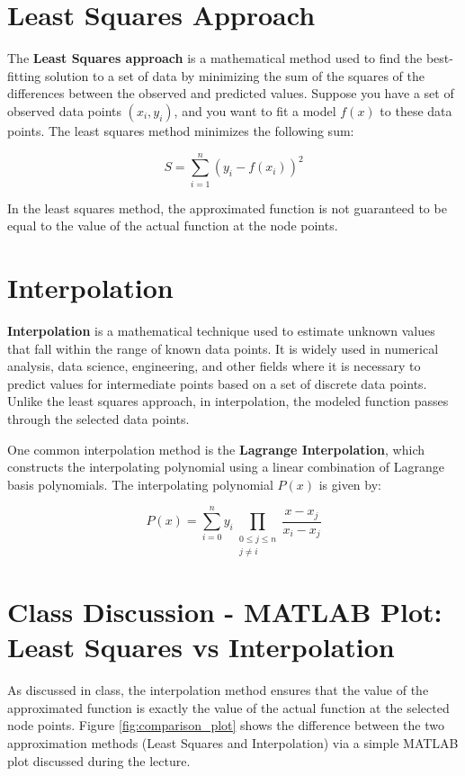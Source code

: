 \documentclass[12pt]{report} %
\begin{document}
\section{Least Squares Approach}
The \textbf{Least Squares approach} is a mathematical method used to find the best-fitting solution to a set of data by minimizing the sum of the squares of the differences between the observed and predicted values. Suppose you have a set of observed data points $(x_i, y_i)$, and you want to fit a model $f(x)$ to these data points. The least squares method minimizes the following sum:

\begin{equation}
    S = \sum_{i=1}^{n} \left( y_i - f(x_i) \right)^2
\end{equation}

In the least squares method, the approximated function is not guaranteed to be equal to the value of the actual function at the node points.

\section{Interpolation}
\textbf{Interpolation} is a mathematical technique used to estimate unknown values that fall within the range of known data points. It is widely used in numerical analysis, data science, engineering, and other fields where it is necessary to predict values for intermediate points based on a set of discrete data points. Unlike the least squares approach, in interpolation, the modeled function passes through the selected data points.

One common interpolation method is the \textbf{Lagrange Interpolation}, which constructs the interpolating polynomial using a linear combination of Lagrange basis polynomials. The interpolating polynomial $P(x)$ is given by:

\begin{equation}
    P(x) = \sum_{i=0}^{n} y_i \prod_{\substack{0 \leq j \leq n \\ j \neq i}} \frac{x - x_j}{x_i - x_j}
\end{equation}

\section{Class Discussion - MATLAB Plot: Least Squares vs Interpolation}
As discussed in class, the interpolation method ensures that the value of the approximated function is exactly the value of the actual function at the selected node points. Figure \ref{fig:comparison_plot} shows the difference between the two approximation methods (Least Squares and Interpolation) via a simple MATLAB plot discussed during the lecture.
\end{document}
